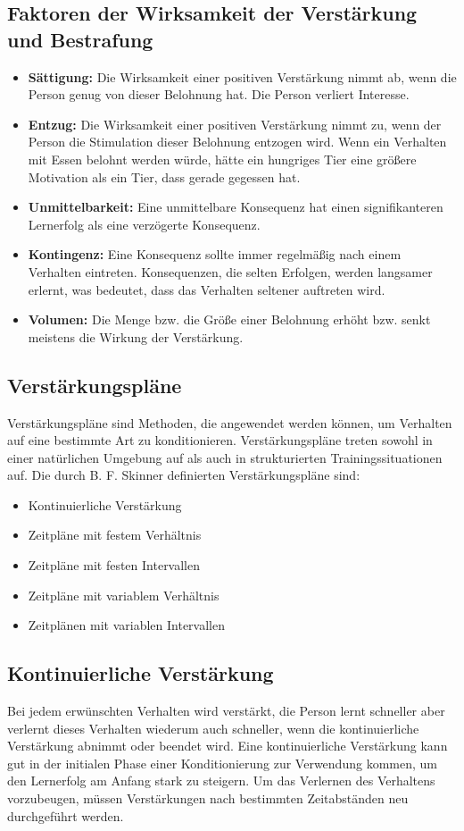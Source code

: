 \subsection{Faktoren der Wirksamkeit der Verstärkung und Bestrafung}	
\begin{itemize}
	\item \textbf{Sättigung:} Die Wirksamkeit einer positiven Verstärkung nimmt ab, wenn die Person genug von dieser Belohnung hat. Die Person verliert Interesse.
	\item \textbf{Entzug:} Die Wirksamkeit einer positiven Verstärkung nimmt zu, wenn der Person die Stimulation dieser Belohnung entzogen wird. Wenn ein Verhalten mit Essen belohnt werden würde, hätte ein hungriges Tier eine größere Motivation als ein Tier, dass gerade gegessen hat. 
	\item \textbf{Unmittelbarkeit:} Eine unmittelbare Konsequenz hat einen signifikanteren Lernerfolg als eine verzögerte Konsequenz. 
	\item \textbf{Kontingenz:} Eine Konsequenz sollte immer regelmäßig nach einem Verhalten eintreten. Konsequenzen, die selten Erfolgen, werden langsamer erlernt, was bedeutet, dass das Verhalten seltener auftreten wird. 
	\item \textbf{Volumen:} Die Menge bzw. die Größe einer Belohnung erhöht bzw. senkt meistens die Wirkung der Verstärkung. 
\end{itemize}
\subsection{Verstärkungspläne}
Verstärkungspläne sind Methoden, die angewendet werden können, um Verhalten auf eine bestimmte Art zu konditionieren. 
Verstärkungspläne treten sowohl in einer natürlichen Umgebung auf als auch in strukturierten Trainingssituationen auf. 
Die durch B. F. Skinner definierten Verstärkungspläne sind: 
\begin{itemize}
	\item Kontinuierliche Verstärkung
	\item Zeitpläne mit festem Verhältnis
	\item Zeitpläne mit festen Intervallen
	\item Zeitpläne mit variablem Verhältnis
	\item Zeitplänen mit variablen Intervallen
\end{itemize}
\subsection{Kontinuierliche Verstärkung}
Bei jedem erwünschten Verhalten wird verstärkt, die Person lernt schneller aber verlernt dieses Verhalten wiederum auch schneller, wenn die kontinuierliche Verstärkung abnimmt oder beendet wird. 
Eine kontinuierliche Verstärkung kann gut in der initialen Phase einer Konditionierung zur Verwendung kommen, um den Lernerfolg am Anfang stark zu steigern.
Um das Verlernen des Verhaltens vorzubeugen, müssen Verstärkungen nach bestimmten Zeitabständen neu durchgeführt werden. 
